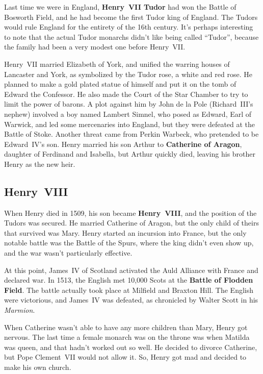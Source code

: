 Last time we were in England, \textbf{Henry~VII Tudor} had won the Battle of Bosworth Field,
and he had become the first Tudor king of England.
The Tudors would rule England for the entirety of the 16th century.
It's perhaps interesting to note that the actual Tudor monarchs didn't like being called ``Tudor'',
because the family had been a very modest one before Henry~VII\@.

Henry~VII married Elizabeth of York, and unified the warring houses of Lancaster and York,
as symbolized by the Tudor rose, a white and red rose.
He planned to make a gold plated statue of himself and put it on the tomb of Edward the Confessor.
He also made the Court of the Star Chamber to try to limit the power of barons.
A plot against him by John de la Pole (Richard~III's nephew) involved a boy named Lambert Simnel,
who posed as Edward, Earl of Warwick,
and led some mercenaries into England, but they were defeated at the Battle of Stoke.
Another threat came from Perkin Warbeck, who pretended to be Edward~IV's son.
Henry married his son Arthur to \textbf{Catherine of Aragon}, daughter of Ferdinand and Isabella,
but Arthur quickly died, leaving his brother Henry as the new heir.

\subsection*{Henry~VIII}

When Henry died in 1509, his son became \textbf{Henry~VIII}, and the position of the Tudors was secured.
He married Catherine of Aragon, but the only child of theirs that survived was Mary.
Henry started an incursion into France, but the only notable battle was the Battle of the Spurs,
where the king didn't even show up, and the war wasn't particularly effective.

At this point, James~IV of Scotland activated the Auld Alliance with France and declared war.
In 1513, the English met 10,000 Scots at the \textbf{Battle of Flodden Field}.
The battle actually took place at Milfield and Braxton Hill.
The English were victorious, and James~IV was defeated, as chronicled by Walter Scott in his \textit{Marmion}.

When Catherine wasn't able to have any more children than Mary, Henry got nervous.
The last time a female monarch was on the throne was when Matilda was queen,
and that hadn't worked out so well.
He decided to divorce Catherine, but Pope Clement~VII would not allow it.
So, Henry got mad and decided to make his own church.

